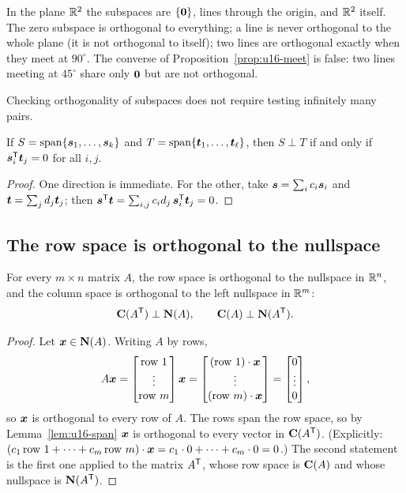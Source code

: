 In the plane $\mathbb{R}^2$ the subspaces are $\{\boldsymbol{0}\}$, lines through the origin, and $\mathbb{R}^2$
itself. The zero subspace is orthogonal to everything; a line is never orthogonal to the whole
plane (it is not orthogonal to itself); two lines are orthogonal exactly when they meet at
$90^\circ$. The converse of Proposition~\ref{prop:u16-meet} is false: two lines meeting at
$45^\circ$ share only $\boldsymbol{0}$ but are not orthogonal.

Checking orthogonality of subspaces does not require testing infinitely many pairs.

\begin{lemma}\label{lem:u16-span}
If $S=\operatorname{span}\{\boldsymbol{s}_1,\dots,\boldsymbol{s}_k\}$ and $T=\operatorname{span}\{\boldsymbol{t}_1,\dots,\boldsymbol{t}_\ell\}$, then
$S\perp T$ if and only if $\boldsymbol{s}_i^{\mathsf{T}}\boldsymbol{t}_j=0$ for all $i,j$.
\end{lemma}

\begin{proof}
One direction is immediate. For the other, take $\boldsymbol{s}=\sum_i c_i\boldsymbol{s}_i$ and
$\boldsymbol{t}=\sum_j d_j\boldsymbol{t}_j$; then
$\boldsymbol{s}^{\mathsf{T}}\boldsymbol{t}=\sum_{i,j}c_id_j\,\boldsymbol{s}_i^{\mathsf{T}}\boldsymbol{t}_j=0$.
\end{proof}

\subsection{The row space is orthogonal to the nullspace}

\begin{theorem}\label{thm:u16-rowperp}
For every $m\times n$ matrix $A$, the row space is orthogonal to the nullspace in $\mathbb{R}^n$, and
the column space is orthogonal to the left nullspace in $\mathbb{R}^m$:
\[
  \mathbf{C}(A^{\mathsf{T}})\perp\mathbf{N}(A),\qquad \mathbf{C}(A)\perp\mathbf{N}(A^{\mathsf{T}}).
\]
\end{theorem}

\begin{proof}
Let $\boldsymbol{x}\in\mathbf{N}(A)$. Writing $A$ by rows,
\[
  A\boldsymbol{x}=\begin{bmatrix}\text{row }1\\ \vdots\\ \text{row }m\end{bmatrix}\boldsymbol{x}
  =\begin{bmatrix}(\text{row }1)\cdot\boldsymbol{x}\\ \vdots\\ (\text{row }m)\cdot\boldsymbol{x}\end{bmatrix}
  =\begin{bmatrix}0\\ \vdots\\ 0\end{bmatrix},
\]
so $\boldsymbol{x}$ is orthogonal to every row of $A$. The rows span the row space, so by
Lemma~\ref{lem:u16-span} $\boldsymbol{x}$ is orthogonal to every vector in $\mathbf{C}(A^{\mathsf{T}})$. (Explicitly:
$(c_1\,\text{row }1+\cdots+c_m\,\text{row }m)\cdot\boldsymbol{x}=c_1\cdot 0+\cdots+c_m\cdot 0=0$.)
The second statement is the first one applied to the matrix $A^{\mathsf{T}}$, whose row space is
$\mathbf{C}(A)$ and whose nullspace is $\mathbf{N}(A^{\mathsf{T}})$.
\end{proof}

